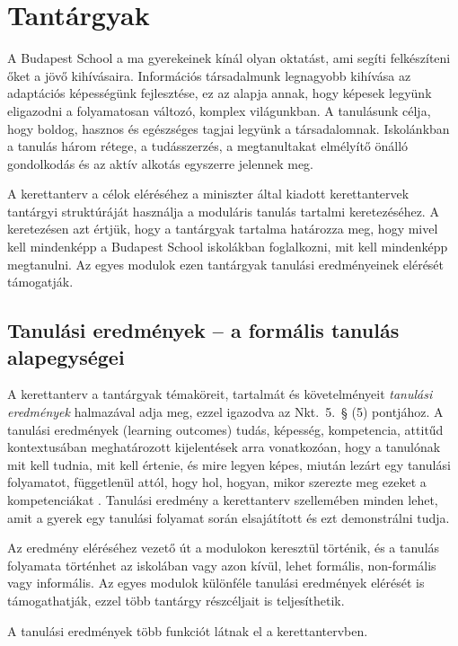 \section{Tantárgyak}
\label{sec:tantargyak}
A Budapest School a ma gyerekeinek kínál olyan oktatást, ami segíti felkészíteni őket a jövő kihívásaira. Információs társadalmunk legnagyobb kihívása az adaptációs képességünk fejlesztése, ez az alapja annak, hogy képesek legyünk eligazodni a folyamatosan változó, komplex világunkban. A tanulásunk célja, hogy boldog, hasznos és egészséges tagjai legyünk a társadalomnak. Iskolánkban a tanulás három rétege, a tudásszerzés, a megtanultakat elmélyítő önálló gondolkodás és az aktív alkotás egyszerre jelennek meg.

A kerettanterv a célok eléréséhez a miniszter által kiadott kerettantervek tantárgyi struktúráját használja  a moduláris tanulás tartalmi keretezéséhez. A keretezésen azt értjük, hogy a tantárgyak tartalma határozza meg, hogy mivel kell mindenképp a Budapest School iskolákban foglalkozni, mit kell mindenképp megtanulni. 
Az egyes modulok ezen tantárgyak tanulási eredményeinek elérését támogatják.

\subsection{Tanulási eredmények -- a formális tanulás alapegységei}
\label{sec:tanulasi_eredmenyek}
A kerettanterv a tantárgyak témaköreit, tartalmát és követelményeit \emph{tanulási eredmények} halmazával adja meg, ezzel igazodva az Nkt.~5.~§ (5) pontjához. A tanulási eredmények (learning out\-comes) tudás, képesség, kompetencia, attitűd kontextusában meghatározott kijelentések arra vonatkozóan, hogy a tanulónak mit kell tudnia, mit kell értenie, és mire legyen képes, miután lezárt egy tanulási folyamatot, függetlenül attól, hogy hol, hogyan, mikor szerezte meg ezeket a kompetenciákat \citep{learning_outcomes}.  Tanulási eredmény a kerettanterv szellemében minden lehet, amit a gyerek egy tanulási folyamat során elsajátított és ezt demonstrálni tudja.

Az eredmény eléréséhez vezető út a modulokon keresztül történik, és a tanulás folyamata történhet az iskolában vagy azon kívül, lehet formális, non-formális vagy informális.
Az egyes modulok különféle tanulási eredmények elérését is támogathatják, ezzel több tantárgy részcéljait is teljesíthetik.
\newpage

A tanulási eredmények több funkciót látnak el a kerettantervben.

